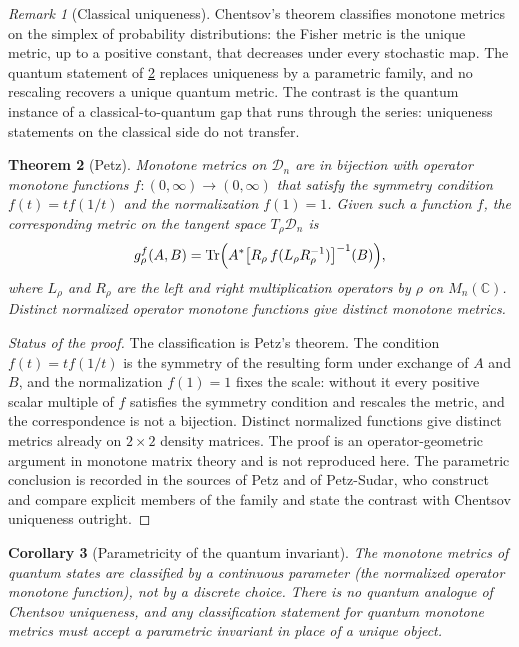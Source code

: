 \documentclass[11pt,letterpaper]{article}
\newtheorem{theorem}{Theorem}[section]
\newtheorem{corollary}[theorem]{Corollary}
\theoremstyle{definition}
\theoremstyle{remark}
\newtheorem{remark}[theorem]{Remark}
\begin{document}
\begin{remark}[Classical uniqueness]
\label{rem:chentsov}
Chentsov's theorem classifies monotone metrics on the simplex of probability distributions: the Fisher metric is the unique metric, up to a positive constant, that decreases under every stochastic map. The quantum statement of \cref{thm:petz} replaces uniqueness by a parametric family, and no rescaling recovers a unique quantum metric. The contrast is the quantum instance of a classical-to-quantum gap that runs through the series: uniqueness statements on the classical side do not transfer.
\end{remark}

\begin{theorem}[Petz]
\label{thm:petz}
Monotone metrics on $\mathcal{D}_n$ are in bijection with operator monotone functions $f: (0,\infty) \to (0,\infty)$ that satisfy the symmetry condition $f(t) = t f(1/t)$ and the normalization $f(1) = 1$. Given such a function $f$, the corresponding metric on the tangent space $T_\rho \mathcal{D}_n$ is
\[
g_\rho^f(A, B) = \operatorname{Tr}\Bigl(A^* \bigl[R_\rho \, f(L_\rho R_\rho^{-1})\bigr]^{-1}(B)\Bigr),
\]
where $L_\rho$ and $R_\rho$ are the left and right multiplication operators by $\rho$ on $M_n(\mathbb{C})$. Distinct normalized operator monotone functions give distinct monotone metrics.
\end{theorem}

\begin{proof}[Status of the proof]
The classification is Petz's theorem. The condition $f(t) = t f(1/t)$ is the symmetry of the resulting form under exchange of $A$ and $B$, and the normalization $f(1) = 1$ fixes the scale: without it every positive scalar multiple of $f$ satisfies the symmetry condition and rescales the metric, and the correspondence is not a bijection. Distinct normalized functions give distinct metrics already on $2 \times 2$ density matrices. The proof is an operator-geometric argument in monotone matrix theory and is not reproduced here. The parametric conclusion is recorded in the sources of Petz and of Petz-Sudar, who construct and compare explicit members of the family and state the contrast with Chentsov uniqueness outright.
\end{proof}

\begin{corollary}[Parametricity of the quantum invariant]
\label{cor:parametric}
The monotone metrics of quantum states are classified by a continuous parameter (the normalized operator monotone function), not by a discrete choice. There is no quantum analogue of Chentsov uniqueness, and any classification statement for quantum monotone metrics must accept a parametric invariant in place of a unique object.
\end{corollary}
\end{document}
